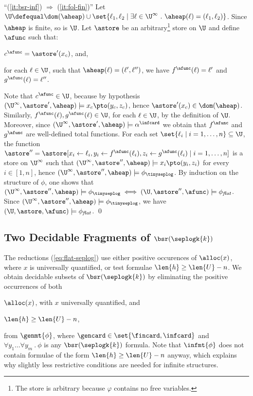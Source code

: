 \noindent``(\ref{it:bsr-inf}) $\Rightarrow$ (\ref{it:fol-fin})'' Let
$\U \defequal \dom(\aheap) \cup \set{\ell_1,\ell_2 \mid \exists \ell
  \in \U^\infty ~.~ \aheap(\ell) = (\ell_1,\ell_2)}$. Since $\aheap$
is finite, so is $\U$. Let $\astore$ be an arbitrary\footnote{The
  store is arbitrary because $\varphi$ contains no free variables.}
store on $\U$ and define $\afunc$ such that: \begin{compactitem}
  \item $c^\afunc = \astore'(x_c)$, and,
  \item for each $\ell \in \U$, such that $\aheap(\ell) =
    (\ell',\ell'')$, we have $f^\afunc(\ell) = \ell'$ and
    $g^\afunc(\ell) = \ell''$.
\end{compactitem}
Note that $c^\afunc\in \U$, because by hypothesis
$(\U^\infty,\astore',\aheap) \models x_c \pto (y_c,z_c)$, hence
$\astore'(x_c) \in \dom(\aheap)$.  Similarly,
$f^\afunc(\ell),g^\afunc(\ell) \in \U$, for each $\ell \in \U$, by the
definition of $\U$.  Moreover, since $(\U^\infty,\astore',\aheap)
\models \alpha^\infcard$ we obtain that $f^\afunc$ and $g^\afunc$ are
well-defined total functions.  For each set $\set{\ell_i
  \mid i = 1,\ldots,n} \subseteq \U$, the function $\astore'' =
\astore[x_i \leftarrow \ell_i, y_i \leftarrow f^{\afunc}(\ell_i), z_i
  \leftarrow g^\afunc(\ell_i) \mid i=1,\ldots,n]$ is a store on
$\U^\infty$ such that $(\U^{\infty},\astore'',\aheap) \models x_i \pto
(y_i,z_i)$ for every $i\in [1,n]$, hence
$(\U^{\infty},\astore'',\aheap) \models \phi_{\tinyseplog}$.  By
induction on the structure of $\phi$, one shows that
$(\U^\infty,\astore'',\aheap) \models \phi_{\tinyseplog} \iff
(\U,\astore'',\afunc) \models \phi_{\mathit{flat}}$. Since
$(\U^\infty,\astore'',\aheap) \models \phi_{\tinyseplog}$, we have
$(\U,\astore,\afunc) \models \phi_{\mathit{flat}}$. \qed


\subsection{Two Decidable Fragments of $\bsr(\seplogk{k})$}
\label{sec:bsr-sl-dec}

The reductions (\ref{eq:flat-seplog}) use either positive occurences
of $\alloc(x)$, where $x$ is universally quantified, or test formulae
$\len{h} \geq \len{U}-n$. We obtain decidable subsets of
$\bsr(\seplogk{k})$ by eliminating the positive occurrences of
both 
\begin{inparaenum}[(i)]
\item $\alloc(x)$, with $x$ universally quantified, and 
%
\item $\len{h} \geq \len{U}-n$,
\end{inparaenum}
from $\genmt{\phi}$, where $\gencard \in \set{\fincard,\infcard}$ and
$\forall y_1 \ldots \forall y_m ~.~ \phi$ is any $\bsr(\seplogk{k})$
formula.  Note that $\infmt{\phi}$ does not contain 
formulae of the form $\len{h} \geq \len{U}-n$ anyway, which explains why 
slightly less restrictive conditions are needed for infinite structures.

